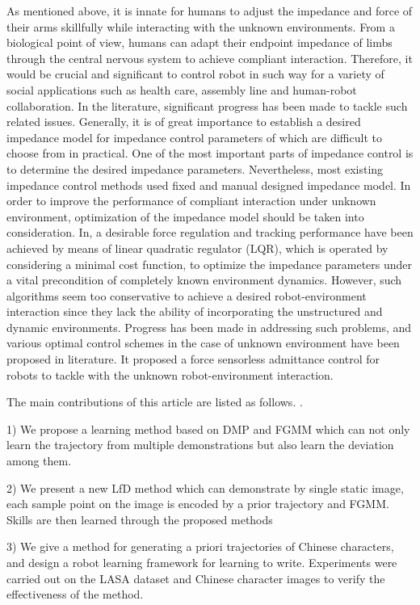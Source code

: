 \documentclass[journal]{IEEEtran}
\begin{document}
As mentioned above, it is innate for humans to adjust the impedance and force of their arms skillfully while interacting with the unknown environments. From a biological point of view, humans can adapt their endpoint impedance of limbs through the central nervous system to achieve compliant interaction. Therefore, it would be crucial and significant to control robot in such way for a variety of social applications such as health care, assembly line and human-robot collaboration. In the literature, significant progress has been made to tackle such related issues. Generally, it is of great importance to establish a desired impedance model for impedance control parameters of which are difficult to choose from in practical. One of the most important parts of impedance control is to determine the desired impedance parameters. Nevertheless, most existing impedance control methods used fixed and manual designed impedance model. In order to improve the performance of compliant interaction under unknown environment, optimization of the impedance model should be taken into consideration. In, a desirable force regulation and tracking performance have been achieved by means of linear quadratic regulator (LQR), which is operated by considering a minimal cost function, to optimize the impedance parameters under a vital precondition of completely known environment dynamics. However, such algorithms seem too conservative to achieve a desired robot-environment interaction since they lack the ability of incorporating the unstructured and dynamic environments. Progress has been made in addressing such problems, and various optimal control schemes in the case of unknown environment have been proposed in literature. It proposed a force sensorless admittance control for robots to tackle with the unknown robot-environment interaction.

The main contributions of this article are listed as follows. \cite{Ju2012}.

1) We propose a learning method based on DMP and FGMM which can not only learn the trajectory from multiple demonstrations but also learn the deviation among them.

2) We present a new LfD method which can demonstrate by single static image, each sample point on the image is encoded by a prior trajectory and FGMM. Skills are then learned through the proposed methods

3) We give a method for generating a priori trajectories of Chinese characters, and design a robot learning framework for learning to write. Experiments were carried out on the LASA dataset and Chinese character images to verify the effectiveness of the method.
\end{document}
